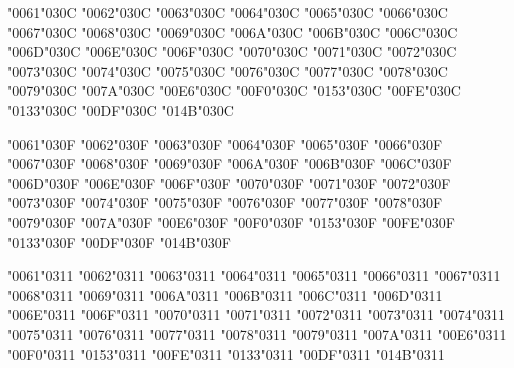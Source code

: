 \textsc{\char"0061\char"030C} \textsc{\char"0062\char"030C} \textsc{\char"0063\char"030C} \textsc{\char"0064\char"030C} \textsc{\char"0065\char"030C} \textsc{\char"0066\char"030C} \textsc{\char"0067\char"030C} \textsc{\char"0068\char"030C} \textsc{\char"0069\char"030C} \textsc{\char"006A\char"030C} \textsc{\char"006B\char"030C} \textsc{\char"006C\char"030C} \textsc{\char"006D\char"030C} \textsc{\char"006E\char"030C} \textsc{\char"006F\char"030C} \textsc{\char"0070\char"030C} \textsc{\char"0071\char"030C} \textsc{\char"0072\char"030C} \textsc{\char"0073\char"030C} \textsc{\char"0074\char"030C} \textsc{\char"0075\char"030C} \textsc{\char"0076\char"030C} \textsc{\char"0077\char"030C} \textsc{\char"0078\char"030C} \textsc{\char"0079\char"030C} \textsc{\char"007A\char"030C} \textsc{\char"00E6\char"030C} \textsc{\char"00F0\char"030C} \textsc{\char"0153\char"030C} \textsc{\char"00FE\char"030C} \textsc{\char"0133\char"030C} \textsc{\char"00DF\char"030C} \textsc{\char"014B\char"030C}

\textsc{\char"0061\char"030F} \textsc{\char"0062\char"030F} \textsc{\char"0063\char"030F} \textsc{\char"0064\char"030F} \textsc{\char"0065\char"030F} \textsc{\char"0066\char"030F} \textsc{\char"0067\char"030F} \textsc{\char"0068\char"030F} \textsc{\char"0069\char"030F} \textsc{\char"006A\char"030F} \textsc{\char"006B\char"030F} \textsc{\char"006C\char"030F} \textsc{\char"006D\char"030F} \textsc{\char"006E\char"030F} \textsc{\char"006F\char"030F} \textsc{\char"0070\char"030F} \textsc{\char"0071\char"030F} \textsc{\char"0072\char"030F} \textsc{\char"0073\char"030F} \textsc{\char"0074\char"030F} \textsc{\char"0075\char"030F} \textsc{\char"0076\char"030F} \textsc{\char"0077\char"030F} \textsc{\char"0078\char"030F} \textsc{\char"0079\char"030F} \textsc{\char"007A\char"030F} \textsc{\char"00E6\char"030F} \textsc{\char"00F0\char"030F} \textsc{\char"0153\char"030F} \textsc{\char"00FE\char"030F} \textsc{\char"0133\char"030F} \textsc{\char"00DF\char"030F} \textsc{\char"014B\char"030F}

\textsc{\char"0061\char"0311} \textsc{\char"0062\char"0311} \textsc{\char"0063\char"0311} \textsc{\char"0064\char"0311} \textsc{\char"0065\char"0311} \textsc{\char"0066\char"0311} \textsc{\char"0067\char"0311} \textsc{\char"0068\char"0311} \textsc{\char"0069\char"0311} \textsc{\char"006A\char"0311} \textsc{\char"006B\char"0311} \textsc{\char"006C\char"0311} \textsc{\char"006D\char"0311} \textsc{\char"006E\char"0311} \textsc{\char"006F\char"0311} \textsc{\char"0070\char"0311} \textsc{\char"0071\char"0311} \textsc{\char"0072\char"0311} \textsc{\char"0073\char"0311} \textsc{\char"0074\char"0311} \textsc{\char"0075\char"0311} \textsc{\char"0076\char"0311} \textsc{\char"0077\char"0311} \textsc{\char"0078\char"0311} \textsc{\char"0079\char"0311} \textsc{\char"007A\char"0311} \textsc{\char"00E6\char"0311} \textsc{\char"00F0\char"0311} \textsc{\char"0153\char"0311} \textsc{\char"00FE\char"0311} \textsc{\char"0133\char"0311} \textsc{\char"00DF\char"0311} \textsc{\char"014B\char"0311}


